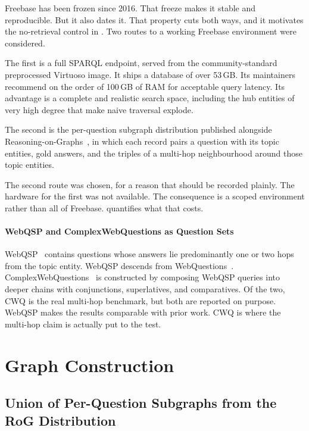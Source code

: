 Freebase has been frozen since 2016. That freeze
makes it stable and reproducible. But it also dates it. That property cuts both
ways, and it motivates the no-retrieval control in . Two
routes to a working Freebase environment were considered.

The first is a full SPARQL endpoint, served from the community-standard
preprocessed Virtuoso image. It ships a database of over 53\,GB. Its maintainers
recommend on the order of 100\,GB of RAM for acceptable query latency. Its
advantage is a complete and realistic search space, including the hub entities
of very high degree that make naive traversal explode.

The second is the per-question subgraph distribution published alongside
Reasoning-on-Graphs~\cite{luo2024reasoning}, in which each record pairs a
question with its topic entities, gold answers, and the triples of a multi-hop
neighbourhood around those topic entities.

The second route was chosen, for a reason that should be recorded plainly. The
hardware for the first was not available. The consequence is a scoped
environment rather than all of Freebase.  quantifies
what that costs.

\paragraph{WebQSP and ComplexWebQuestions as Question Sets}

WebQSP~\cite{yih2016value} contains questions whose answers lie predominantly
one or two hops from the topic entity.
WebQSP descends from WebQuestions~\cite{berant2013semantic}.
ComplexWebQuestions~\cite{talmor2018web} is constructed by composing WebQSP
queries into deeper chains with conjunctions, superlatives, and comparatives. Of
the two, CWQ is the real multi-hop benchmark, but both are reported on purpose.
WebQSP makes the results comparable with prior work. CWQ is where the multi-hop
claim is actually put to the test.

\section{Graph Construction}\label{sec:graph-construction}

\subsection{Union of Per-Question Subgraphs from the RoG Distribution}

